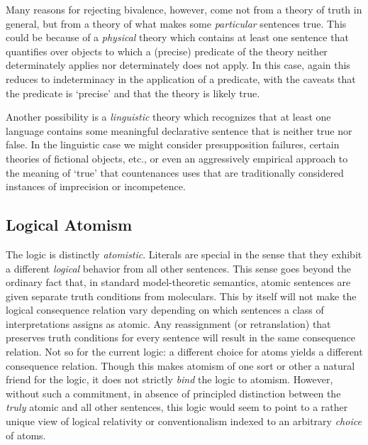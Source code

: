 Many reasons for rejecting bivalence, however, come not from a theory of truth in general, but from a theory of what makes some \emph{particular} sentences true. This could be because of a \emph{physical} theory which contains at least one sentence that quantifies over objects to which a (precise) predicate of the theory neither determinately applies nor determinately does not apply. In this case, again this reduces to indeterminacy in the application of a predicate, with the caveats that the predicate is `precise' and that the theory is likely true.

Another possibility is a \emph{linguistic} theory which recognizes that at least one language contains some meaningful declarative sentence that is neither true nor false. In the linguistic case we might consider presupposition failures, certain theories of fictional objects, etc., or even an aggressively empirical approach to the meaning of `true' that countenances uses that are traditionally considered instances of imprecision or incompetence. 


\subsection{Logical Atomism}\label{atomism}
The logic is distinctly \emph{atomistic}. Literals are special in the sense that they exhibit a different \emph{logical} behavior from all other sentences. This sense goes beyond the ordinary fact that, in standard model-theoretic semantics, atomic sentences are given separate truth conditions from moleculars. This by itself will not make the logical consequence relation vary depending on which sentences a class of interpretations assigns as atomic. Any reassignment (or retranslation) that preserves truth conditions for every sentence will result in the same consequence relation. Not so for the current logic: a different choice for atoms yields a different consequence relation. Though this makes atomism of one sort or other a natural friend for the logic, it does not strictly \emph{bind} the logic to atomism. However, without such a commitment, in absence of principled distinction between the \emph{truly} atomic and all other sentences, this logic would seem to point to a rather unique view of logical relativity or conventionalism indexed to an arbitrary \emph{choice} of atoms.




\nocite{Luk1920, Kleene1938, Kleene1952}

%
%
%
